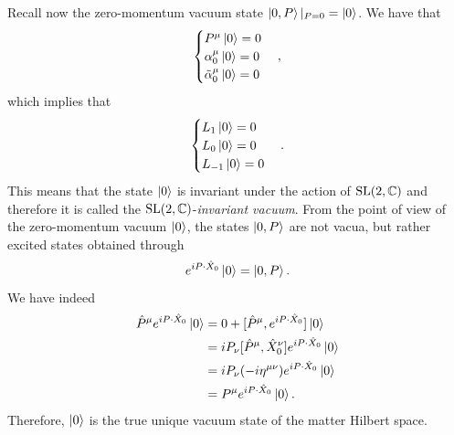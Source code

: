 Recall now the zero-momentum vacuum state $\ket{0,P}|_{P = 0} = \ket{0}$. We have that 
\begin{equation}
    \begin{cases}
        P^\mu\ket{0} = 0 \\
        \alpha^\mu_0\ket{0} = 0 \\
        \tilde{\alpha}^\mu_0\ket{0} = 0
    \end{cases},
\end{equation}
which implies that 
\begin{equation}
    \begin{cases}
        L_1\ket{0} = 0 \\
        L_0\ket{0} = 0 \\
        L_{-1}\ket{0} = 0
    \end{cases}.
\end{equation}
This means that the state $\ket{0}$ is invariant under the action of $\mathrm{SL}(2,\mathbb{C})$ and therefore it is called the $\mathrm{SL}(2,\mathbb{C})$-\emph{invariant vacuum}. From the point of view of the zero-momentum vacuum $\ket{0}$, the states $\ket{0,P}$ are not vacua, but rather excited states obtained through 
\begin{equation}
    e^{iP\cdot\hat{X}_0}\ket{0} = \ket{0,P}.
\end{equation}
We have indeed 
\begin{equation}
    \begin{split}
        \hat{P}^\mu e^{iP\cdot\hat{X}_0}\ket{0} &= 0 + [\hat{P}^\mu,e^{iP\cdot\hat{X}_0}]\ket{0} \\
        &= iP_\nu[\hat{P}^\mu,\hat{X}^\nu_0]e^{iP\cdot\hat{X}_0}\ket{0} \\
        &= iP_\nu(-i\eta^{\mu\nu})e^{iP\cdot\hat{X}_0}\ket{0} \\
        &= P^\mu e^{iP\cdot\hat{X}_0}\ket{0}.
    \end{split}
\end{equation}
Therefore, $\ket{0}$ is the true unique vacuum state of the matter Hilbert space. 

